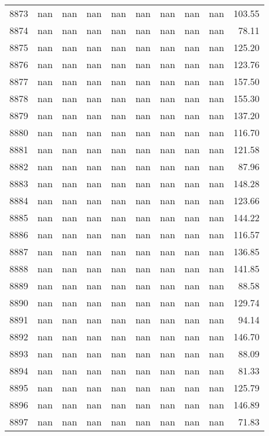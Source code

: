 \begin{tabular}{lrrrrrrrrr}
8873 & nan & nan & nan & nan & nan & nan & nan & nan & 103.55 \\
8874 & nan & nan & nan & nan & nan & nan & nan & nan & 78.11 \\
8875 & nan & nan & nan & nan & nan & nan & nan & nan & 125.20 \\
8876 & nan & nan & nan & nan & nan & nan & nan & nan & 123.76 \\
8877 & nan & nan & nan & nan & nan & nan & nan & nan & 157.50 \\
8878 & nan & nan & nan & nan & nan & nan & nan & nan & 155.30 \\
8879 & nan & nan & nan & nan & nan & nan & nan & nan & 137.20 \\
8880 & nan & nan & nan & nan & nan & nan & nan & nan & 116.70 \\
8881 & nan & nan & nan & nan & nan & nan & nan & nan & 121.58 \\
8882 & nan & nan & nan & nan & nan & nan & nan & nan & 87.96 \\
8883 & nan & nan & nan & nan & nan & nan & nan & nan & 148.28 \\
8884 & nan & nan & nan & nan & nan & nan & nan & nan & 123.66 \\
8885 & nan & nan & nan & nan & nan & nan & nan & nan & 144.22 \\
8886 & nan & nan & nan & nan & nan & nan & nan & nan & 116.57 \\
8887 & nan & nan & nan & nan & nan & nan & nan & nan & 136.85 \\
8888 & nan & nan & nan & nan & nan & nan & nan & nan & 141.85 \\
8889 & nan & nan & nan & nan & nan & nan & nan & nan & 88.58 \\
8890 & nan & nan & nan & nan & nan & nan & nan & nan & 129.74 \\
8891 & nan & nan & nan & nan & nan & nan & nan & nan & 94.14 \\
8892 & nan & nan & nan & nan & nan & nan & nan & nan & 146.70 \\
8893 & nan & nan & nan & nan & nan & nan & nan & nan & 88.09 \\
8894 & nan & nan & nan & nan & nan & nan & nan & nan & 81.33 \\
8895 & nan & nan & nan & nan & nan & nan & nan & nan & 125.79 \\
8896 & nan & nan & nan & nan & nan & nan & nan & nan & 146.89 \\
8897 & nan & nan & nan & nan & nan & nan & nan & nan & 71.83 \\

\end{tabular}
